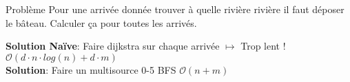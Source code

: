 \begin{frame}
    \frametitle{\problemtitle}
        \begin{block}
            {Problème} Pour une arrivée donnée trouver à quelle rivière rivière il faut déposer le bâteau. Calculer ça pour toutes les arrivés.
        \end{block}
        \pause
        \textbf{Solution Naïve}: Faire dijkstra sur chaque arrivée $\mapsto$ Trop lent ! $\mathcal{O}(d \cdot n \cdot log(n) + d \cdot m)$\\
        \pause
        \textbf{Solution}: Faire un multisource 0-5 BFS $\mathcal{O}(n + m)$
\end{frame}